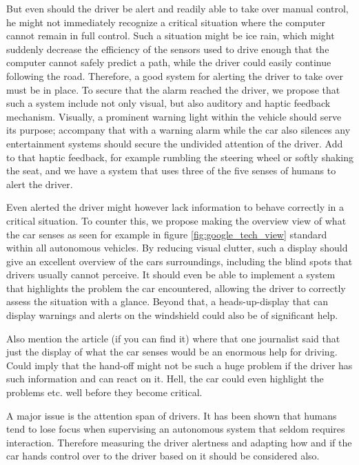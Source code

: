 \documentclass{acm_proc_article-sp}
\begin{document}
But even should the driver be alert and readily able to take over manual control, he might not immediately recognize a critical situation where the computer cannot remain in full control.
Such a situation might be ice rain, which might suddenly decrease the efficiency of the sensors used to drive enough that the computer cannot safely predict a path, while the driver could easily continue following the road.
Therefore, a good system for alerting the driver to take over must be in place.
To secure that the alarm reached the driver, we propose that such a system include not only visual, but also auditory and haptic feedback mechanism.
Visually, a prominent warning light within the vehicle should serve its purpose; accompany that with a warning alarm while the car also silences any entertainment systems should secure the undivided attention of the driver.
Add to that haptic feedback, for example rumbling the steering wheel or softly shaking the seat, and we have a system that uses three of the five senses of humans to alert the driver.

Even alerted the driver might however lack information to behave correctly in a critical situation.
To counter this, we propose making the overview view of what the car senses as seen for example in figure \ref{fig:google_tech_view} standard within all autonomous vehicles.
By reducing visual clutter, such a display should give an excellent overview of the cars surroundings, including the blind spots that drivers usually cannot perceive.
It should even be able to implement a system that highlights the problem the car encountered, allowing the driver to correctly assess the situation with a glance.
Beyond that, a heads-up-display that can display warnings and alerts on the windshield could also be of significant help.


Also mention the article (if you can find it) where that one journalist said that just the display of what the car senses would be an enormous help for driving.
Could imply that the hand-off might not be such a huge problem if the driver has such information and can react on it.
Hell, the car could even highlight the problems etc. well before they become critical.

A major issue is the attention span of drivers.
It has been shown that humans tend to lose focus when supervising an autonomous system that seldom requires interaction.
Therefore measuring the driver alertness and adapting how and if the car hands control over to the driver based on it should be considered also.
\end{document}
